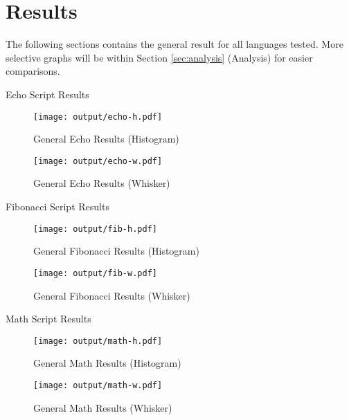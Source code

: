 \section{Results} \label{sec:results}
The following sections contains the general result for all languages tested. More selective graphs will be within Section \ref{sec:analysis} (Analysis) for easier comparisons.

\begin{table}[H]
	\centering
	\caption{Echo Script Results}
	\label{tab:echo}
\end{table}

\begin{figure}[H]
	\centering
		\texttt{[image: output/echo-h.pdf]}
	\caption{General Echo Results (Histogram)}
	\label{fig:echo-h}
\end{figure}

\begin{figure}[H]
	\centering
		\texttt{[image: output/echo-w.pdf]}
	\caption{General Echo Results (Whisker)}
	\label{fig:echo-w}
\end{figure}

\begin{table}[H]
	\centering
	\caption{Fibonacci Script Results}
	\label{tab:fib}
\end{table}

\begin{figure}[H]
	\centering
		\texttt{[image: output/fib-h.pdf]}
	\caption{General Fibonacci Results (Histogram)}
	\label{fig:fib-h}
\end{figure}

\begin{figure}[H]
	\centering
		\texttt{[image: output/fib-w.pdf]}
	\caption{General Fibonacci Results (Whisker)}
	\label{fig:fib-w}
\end{figure}

\begin{table}[H]
	\centering
	\caption{Math Script Results}
	\label{tab:math}
\end{table}

\begin{figure}[H]
	\centering
		\texttt{[image: output/math-h.pdf]}
	\caption{General Math Results (Histogram)}
	\label{fig:math-h}
\end{figure}

\begin{figure}[H]
	\centering
		\texttt{[image: output/math-w.pdf]}
	\caption{General Math Results (Whisker)}
	\label{fig:math-w}
\end{figure}
